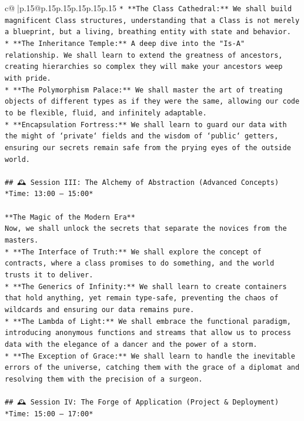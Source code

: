 \documentclass{article}
\begin{document}
{\begin{supertabular}{c@{$\;$}|p{.15\linewidth}@{}p{.15\linewidth}p{.15\linewidth}p{.15\linewidth}p{.15\linewidth}p{.15\linewidth}}
{{{\texttt{*   **The Class Cathedral:** We shall build magnificent Class structures, understanding that a Class is not merely a blueprint, but a living, breathing entity with state and behavior.} \\
\texttt{*   **The Inheritance Temple:** A deep dive into the "Is{-}A" relationship. We shall learn to extend the greatness of ancestors, creating hierarchies so complex they will make your ancestors weep with pride.} \\
\texttt{*   **The Polymorphism Palace:** We shall master the art of treating objects of different types as if they were the same, allowing our code to be flexible, fluid, and infinitely adaptable.} \\
\texttt{*   **Encapsulation Fortress:** We shall learn to guard our data with the might of `private` fields and the wisdom of `public` getters, ensuring our secrets remain safe from the prying eyes of the outside world.} \\
\\ 
\texttt{\#\# 🕰️ Session III: The Alchemy of Abstraction (Advanced Concepts)} \\
\texttt{*Time: 13:00 – 15:00*} \\
\\ 
\texttt{**The Magic of the Modern Era**} \\
\texttt{Now, we shall unlock the secrets that separate the novices from the masters.} \\
\texttt{*   **The Interface of Truth:** We shall explore the concept of contracts, where a class promises to do something, and the world trusts it to deliver.} \\
\texttt{*   **The Generics of Infinity:** We shall learn to create containers that hold anything, yet remain type{-}safe, preventing the chaos of wildcards and ensuring our data remains pure.} \\
\texttt{*   **The Lambda of Light:** We shall embrace the functional paradigm, introducing anonymous functions and streams that allow us to process data with the elegance of a dancer and the power of a storm.} \\
\texttt{*   **The Exception of Grace:** We shall learn to handle the inevitable errors of the universe, catching them with the grace of a diplomat and resolving them with the precision of a surgeon.} \\
\\ 
\texttt{\#\# 🕰️ Session IV: The Forge of Application (Project \& Deployment)} \\
\texttt{*Time: 15:00 – 17:00*} \\
}}}
\end{supertabular}}
\end{document}
